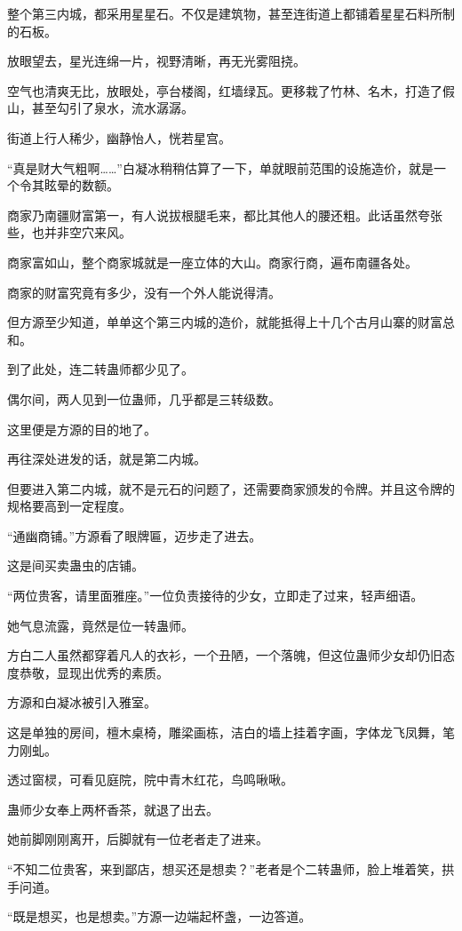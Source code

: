 \begin{this_body}
整个第三内城，都采用星星石。不仅是建筑物，甚至连街道上都铺着星星石料所制的石板。

放眼望去，星光连绵一片，视野清晰，再无光雾阻挠。

空气也清爽无比，放眼处，亭台楼阁，红墙绿瓦。更移栽了竹林、名木，打造了假山，甚至勾引了泉水，流水潺潺。

街道上行人稀少，幽静怡人，恍若星宫。

“真是财大气粗啊……”白凝冰稍稍估算了一下，单就眼前范围的设施造价，就是一个令其眩晕的数额。

商家乃南疆财富第一，有人说拔根腿毛来，都比其他人的腰还粗。此话虽然夸张些，也并非空穴来风。

商家富如山，整个商家城就是一座立体的大山。商家行商，遍布南疆各处。

商家的财富究竟有多少，没有一个外人能说得清。

但方源至少知道，单单这个第三内城的造价，就能抵得上十几个古月山寨的财富总和。

到了此处，连二转蛊师都少见了。

偶尔间，两人见到一位蛊师，几乎都是三转级数。

这里便是方源的目的地了。

再往深处进发的话，就是第二内城。

但要进入第二内城，就不是元石的问题了，还需要商家颁发的令牌。并且这令牌的规格要高到一定程度。

“通幽商铺。”方源看了眼牌匾，迈步走了进去。

这是间买卖蛊虫的店铺。

“两位贵客，请里面雅座。”一位负责接待的少女，立即走了过来，轻声细语。

她气息流露，竟然是位一转蛊师。

方白二人虽然都穿着凡人的衣衫，一个丑陋，一个落魄，但这位蛊师少女却仍旧态度恭敬，显现出优秀的素质。

方源和白凝冰被引入雅室。

这是单独的房间，檀木桌椅，雕梁画栋，洁白的墙上挂着字画，字体龙飞凤舞，笔力刚虬。

透过窗棂，可看见庭院，院中青木红花，鸟鸣啾啾。

蛊师少女奉上两杯香茶，就退了出去。

她前脚刚刚离开，后脚就有一位老者走了进来。

“不知二位贵客，来到鄙店，想买还是想卖？”老者是个二转蛊师，脸上堆着笑，拱手问道。

“既是想买，也是想卖。”方源一边端起杯盏，一边答道。


\end{this_body}
